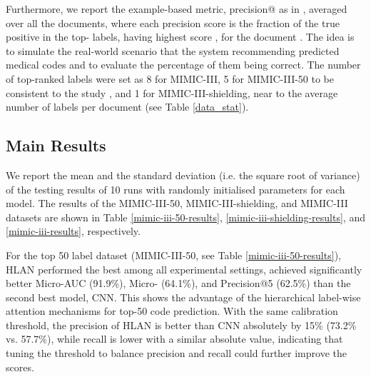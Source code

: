 \documentclass[final,5p,times,twocolumn]{elsarticle}
\begin{document}
Furthermore, we report the example-based metric, precision@ as in \cite{mullenbach-etal-2018-explainable}, averaged over all the documents, where each precision score is the fraction of the true positive in the top- labels, having highest score , for the document . The idea is to simulate the real-world scenario that the system recommending  predicted medical codes and to evaluate the percentage of them being correct. The number of top-ranked labels  were set as 8 for MIMIC-III, 5 for MIMIC-III-50 to be consistent to the study \cite{mullenbach-etal-2018-explainable}, and 1 for MIMIC-III-shielding, near to the average number of labels per document (see Table \ref{data_stat}).

\subsection{Main Results}
\label{main-results}
We report the mean and the standard deviation (i.e. the square root of variance) of the testing results of 10 runs with randomly initialised parameters for each model. The results of the MIMIC-III-50, MIMIC-III-shielding, and MIMIC-III datasets are shown in Table \ref{mimic-iii-50-results}, \ref{mimic-iii-shielding-results}, and \ref{mimic-iii-results}, respectively.

For the top 50 label dataset (MIMIC-III-50, see Table \ref{mimic-iii-50-results}), HLAN performed the best among all experimental settings, achieved significantly better Micro-AUC (91.9\%), Micro- (64.1\%), and Precision@5 (62.5\%) than the second best model, CNN. This shows the advantage of the hierarchical label-wise attention mechanisms for top-50 code prediction. With the same calibration threshold, the precision of HLAN is better than CNN absolutely by 15\% (73.2\% vs. 57.7\%), while recall is lower with a similar absolute value, indicating that tuning the threshold to balance precision and recall could further improve the  scores.
\end{document}
